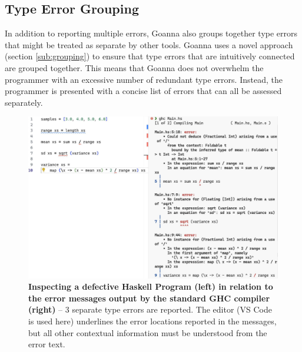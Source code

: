 \documentclass[pdflatex,lineno,sn-nature,Numbered]{sn-jnl}%
\begin{document}
    \subsection{Type Error Grouping}  \label{sub:group}
    In addition to reporting multiple errors, Goanna also groups together type errors that might be treated as separate by other tools. Goanna uses a novel approach (section \ref{sub:grouping}) to ensure that type errors that are intuitively connected are grouped together. This means that Goanna does not overwhelm the programmer with an excessive number of redundant type errors. Instead, the programmer is presented with a concise list of errors that can all be assessed separately.

    \begin{figure}[ht]
        \centering
        \includegraphics[width=\linewidth]{images/variance-ghc2}
        \caption[Inspecting a defective Haskell Program in relation to the error messages output by the standard GHC compiler]{\textbf{Inspecting a defective Haskell Program (left) in relation to the error messages output by the standard GHC compiler (right)} -- 3 separate type errors are reported.  The editor (VS Code is used here) underlines the error locations reported in the messages, but all other contextual information must be understood from the error text.}
        \label{fig:grouping-ghc}
    \end{figure}
    
\end{document}
